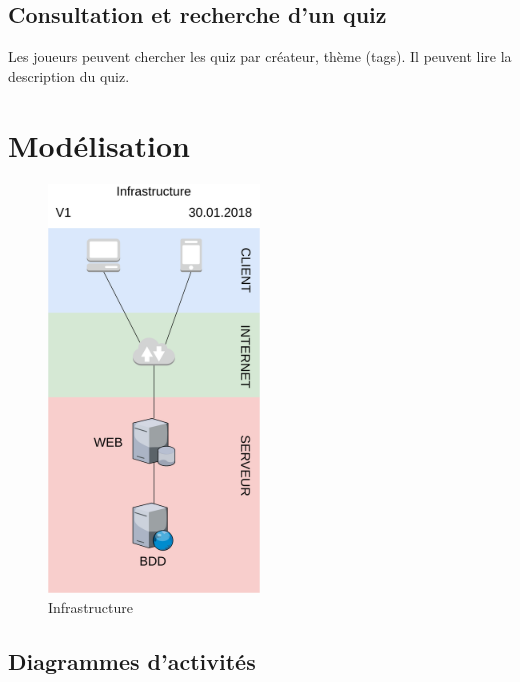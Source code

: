\documentclass[a4paper, 12pt]{article}
\begin{document}
\subsection{Consultation et recherche d'un quiz}
Les joueurs peuvent chercher les quiz par créateur, thème (tags). Il peuvent lire la description du quiz.

\newpage
\section{Modélisation}
\begin{figure}
	\begin{center}
		\includegraphics[width=0.5\textwidth]{../diagrams/infrastructure.png}
	\end{center}
    \caption{Infrastructure}
\end{figure}
\subsection{Diagrammes d'activités}
\end{document}
